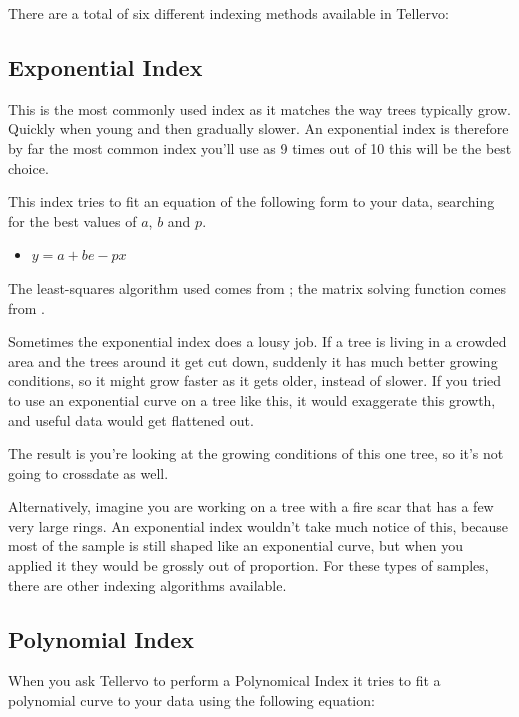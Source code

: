 There are a total of six different indexing methods available in Tellervo:

\subsection{Exponential Index}
This is the most commonly used index as it matches the way trees typically grow. Quickly when young and then gradually slower.  An exponential index is therefore by far the most common index you'll use as 9 times out of 10 this will be the best choice. 

This index tries to fit an equation of the following form to your data, searching for the best values of $a$, $b$ and $p$. 
\begin{itemize}
 \item $y = a + be-px$ 
\end{itemize}


The least-squares algorithm used comes from \citet{CLR}; the matrix solving function comes from \citet{vanLoan}.

Sometimes the exponential index does a lousy job. If a tree is living in a crowded area and the trees around it get cut down, suddenly it has much better growing conditions, so it might grow faster as it gets older, instead of slower. If you tried to use an exponential curve on a tree like this, it would exaggerate this growth, and useful data would get flattened out.

The result is you're looking at the growing conditions of this one tree, so it's not going to crossdate as well.

Alternatively, imagine you are working on a tree with a fire scar that has a few very large rings. An exponential index wouldn't take much notice of this, because most of the sample is still shaped like an exponential curve, but when you applied it they would be grossly out of proportion. For these types of samples, there are other indexing algorithms available.


\subsection{Polynomial Index}
When you ask Tellervo to perform a Polynomical Index it tries to fit a polynomial curve to your data using the following equation: 


